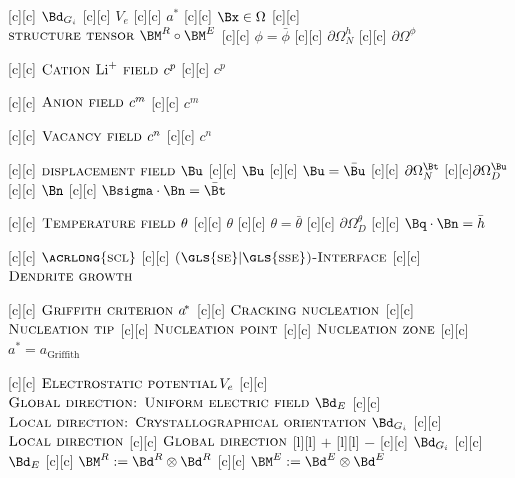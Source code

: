 [c][c] {$\Bd_{G_{i}}$}
[c][c] {$V_{e}$}
[c][c]   {\scriptsize $a^{\!\ast}$}
[c][c] {$\Bx \in \Omega$}
[c][c] {$\textsc{structure tensor } \BM^{R} \circ \BM^{E}$}
[c][c] {$\phi=\bar{\phi}$}
[c][c] {$\partial\Omega^{h}_{N}$}
[c][c] {$\partial\Omega^{\phi}$}

[c][c]  {\scriptsize $\textsc{Cation } \text{Li}^{+}
		\textsc{ field }  c^{p}$}
[c][c]  {$c^{p}$}

[c][c] {\scriptsize $\textsc{Anion field } c^{m}$}
[c][c]  {$c^{m}$}

[c][c]   {\scriptsize $\textsc{Vacancy field } c^{n}$}
[c][c]  {$c^{n}$}

[c][c] {\scriptsize $\textsc{displacement field } \Bu$}
[c][c]   {$\Bu$}
[c][c] {$\Bu=\bar{\Bu}$}
[c][c]  {$\partial\Omega^{\Bt}_{N}$}
[c][c]{$\partial\Omega^{\Bu}_{D}$}
[c][c]    {$\Bn$}
[c][c] {$\Bsigma\cdot\Bn = \bar{\Bt}$}

[c][c]  {\scriptsize $\textsc{Temperature field } \theta$}
[c][c]    {$\theta$}
[c][c] {$\theta = \bar{\theta}$}
[c][c]  {$\partial\Omega^{\theta}_{D}$}
[c][c]  {$\Bq\cdot\Bn = \bar{h}$}

[c][c] {\scriptsize $\textsc{\acrlong{scl}}$}
[c][c]  {\tiny $\textsc{(\gls{se}$|$\gls{sse})-Interface}$}
[c][c] {\tiny $\textsc{Dendrite growth}$}

[c][c] {\scriptsize $\textsc{Griffith criterion } a^{\!\ast}$}
[c][c] {\tiny $\textsc{Cracking nucleation}$}
[c][c] {\tiny $\textsc{Nucleation tip}$}
[c][c] {\tiny $\textsc{Nucleation point}$}
[c][c] {\tiny $\textsc{Nucleation zone}$}
[c][c] {\tiny $a^{\!\ast}\!\!=\!a_{\text{Griffith}}$}

[c][c] {\scriptsize $\textsc{Electrostatic potential}\, V_{e}$}
[c][c]   {\tiny $\textsc{Global direction: Uniform electric field } \Bd_{E}$}
[c][c]   {\tiny $\textsc{Local direction:  Crystallographical orientation } \Bd_{G_{i}}$}
[c][c]   {\tiny $\textsc{Local direction}$}
[c][c]   {\tiny $\textsc{Global direction}$}
[l][l] {$+$}
[l][l] {$-$}
[c][c] {\tiny $\Bd_{G_{i}}$}
[c][c] {\tiny $\Bd_{E}$}
[c][c] {$\BM^{R} := \Bd^{R} \otimes \Bd^{R}$}
[c][c] {$\BM^{E} := \Bd^{E} \otimes \Bd^{E}$}

